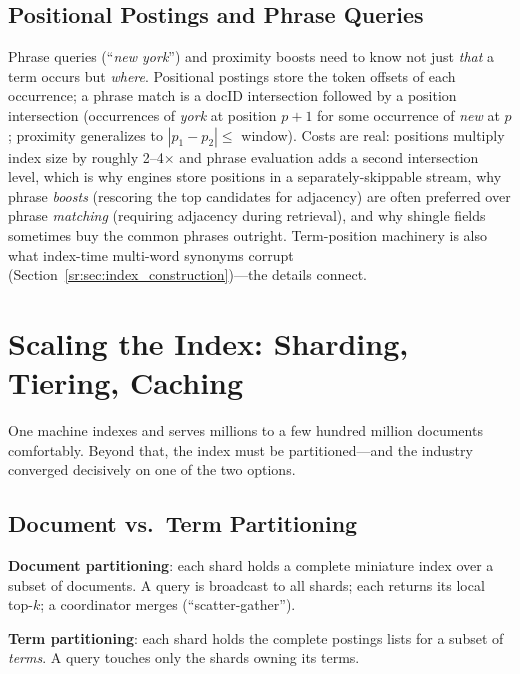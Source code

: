 \subsection{Positional Postings and Phrase Queries}

Phrase queries (``\emph{new york}'') and proximity boosts need to know not just \emph{that} a term occurs but \emph{where}. Positional postings store the token offsets of each occurrence; a phrase match is a docID intersection followed by a position intersection (occurrences of \emph{york} at position $p+1$ for some occurrence of \emph{new} at $p$; proximity generalizes to $|p_1 - p_2| \le$ window). Costs are real: positions multiply index size by roughly 2--4$\times$ and phrase evaluation adds a second intersection level, which is why engines store positions in a separately-skippable stream, why phrase \emph{boosts} (rescoring the top candidates for adjacency) are often preferred over phrase \emph{matching} (requiring adjacency during retrieval), and why shingle fields sometimes buy the common phrases outright. Term-position machinery is also what index-time multi-word synonyms corrupt (Section~\ref{sr:sec:index_construction})---the details connect.

\section{Scaling the Index: Sharding, Tiering, Caching}
\label{sr:sec:scaling}

One machine indexes and serves millions to a few hundred million documents comfortably. Beyond that, the index must be partitioned---and the industry converged decisively on one of the two options.

\subsection{Document vs.\ Term Partitioning}

\textbf{Document partitioning}: each shard holds a complete miniature index over a subset of documents. A query is broadcast to all shards; each returns its local top-$k$; a coordinator merges (``scatter-gather'').

\textbf{Term partitioning}: each shard holds the complete postings lists for a subset of \emph{terms}. A query touches only the shards owning its terms.

